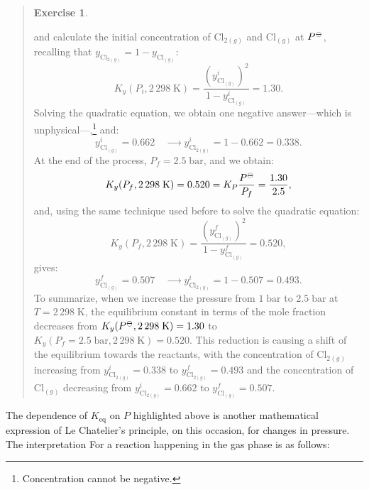\documentclass[
  9pt,
]{extbook}
\theoremstyle{definition}
\theoremstyle{definition}
\theoremstyle{definition}
\newtheorem{exercise}{Exercise}[chapter]
\theoremstyle{definition}
\theoremstyle{remark}
\begin{document}
\begin{quote}
\begin{exercise}
\begin{itemize}
  and calculate the initial concentration of \(\mathrm{Cl}_{2(g)}\) and \(\mathrm{Cl}_{(g)}\) at \(P^{-\kern-6pt{\ominus}\kern-6pt-}\), recalling that \(y_{\mathrm{Cl}_{2(g)}}=1-y_{\mathrm{Cl}_{(g)}}:\)
  \begin{equation}
  K_y (P_i,2\,298\;\text{K})=\frac{\left(y^i_{\mathrm{Cl}_{(g)}}\right)^2}{1-y^i_{\mathrm{Cl}_{(g)}}} = 1.30.
  \end{equation}
  Solving the quadratic equation, we obtain one negative answer---which is unphysical---,\footnote{Concentration cannot be negative.} and:
  \begin{equation}
  y_{\mathrm{Cl}_{(g)}}^i= 0.662 \quad \xrightarrow \qquad y_{\mathrm{Cl}_{2(g)}}^i=1-0.662 = 0.338.
  \end{equation}
  At the end of the process, \(P_f=2.5\;\text{bar}\), and we obtain:
  \begin{equation}
  K_y (P_f,2\,298\;\text{K}) = 0.520 = K_P \frac{P^{-\kern-6pt{\ominus}\kern-6pt-}}{P_f} = \frac{1.30}{2.5},
  \end{equation}
  and, using the same technique used before to solve the quadratic equation:
  \begin{equation}
  K_y (P_f,2\,298\;\text{K})=\frac{\left(y^f_{\mathrm{Cl}_{(g)}}\right)^2}{1-y^f_{\mathrm{Cl}_{(g)}}} = 0.520,
  \end{equation}
  gives:
  \begin{equation}
  y_{\mathrm{Cl}_{(g)}}^f=0.507 \quad \xrightarrow \qquad y_{\mathrm{Cl}_{2(g)}}^i=1-0.507 = 0.493.
  \end{equation}
  To summarize, when we increase the pressure from \(1\;\text{bar}\) to \(2.5\;\text{bar}\) at \(T=2\,298\;\text{K}\), the equilibrium constant in terms of the mole fraction decreases from \(K_y(P^{-\kern-6pt{\ominus}\kern-6pt-},2\,298\;\text{K})=1.30\) to \(K_y(P_f=2.5\;\text{bar},2\,298\;\text{K})=0.520\). This reduction is causing a shift of the equilibrium towards the reactants, with the concentration of \(\text{Cl}_{2(g)}\) increasing from \(y_{\text{Cl}_{2(g)}}^i = 0.338\) to \(y_{\text{Cl}_{2(g)}}^f = 0.493\) and the concentration of \(\text{Cl}_{(g)}\) decreasing from \(y_{\text{Cl}_{2(g)}}^i = 0.662\) to \(y_{\text{Cl}_{(g)}}^f = 0.507\).
\end{itemize}

\end{exercise}
\end{quote}

The dependence of \(K_{\text{eq}}\) on \(P\) highlighted above is another mathematical expression of Le Chatelier's principle, on this occasion, for changes in pressure. The interpretation For a reaction happening in the gas phase is as follows:
\end{document}
